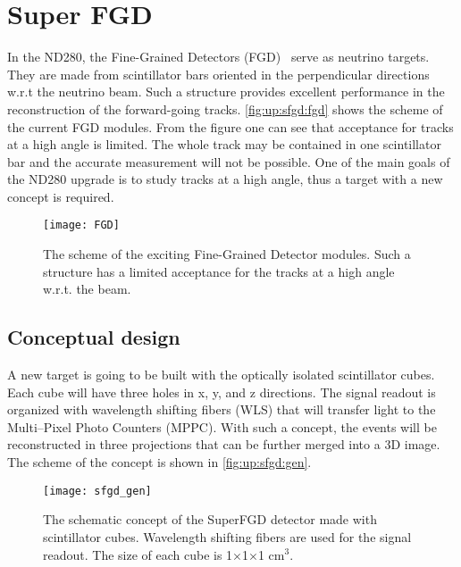 \documentclass[main.tex]{subfiles}
\begin{document}
\renewcommand{\labelitemi}{\ding{226}}
\renewcommand{\labelitemii}{\ding{227}}

\newcommand{\sfgdx}{192}
\newcommand{\sfgdy}{184}
\newcommand{\sfgdz}{56}

\chapter{Super FGD}
\label{ch:up:sfgd}
In the ND280, the Fine-Grained Detectors (FGD)~\cite{Amaudruz2012} serve as neutrino targets. They are made from scintillator bars oriented in the perpendicular directions w.r.t the neutrino beam. Such a structure provides excellent performance in the reconstruction of the forward-going tracks. \autoref{fig:up:sfgd:fgd} shows the scheme of the current FGD modules. From the figure one can see that acceptance for tracks at a high angle is limited. The whole track may be contained in one scintillator bar and the accurate measurement will not be possible. One of the main goals of the ND280 upgrade is to study tracks at a high angle, thus a target with a new concept is required.

\begin{figure}[!ht]
	\centering
	\texttt{[image: FGD]}
	\caption{The scheme of the exciting Fine-Grained Detector modules. Such a structure has a limited acceptance for the tracks at a high angle w.r.t. the beam.}
	\label{fig:up:sfgd:fgd}
\end{figure}

\section{Conceptual design}
A new target is going to be built with the optically isolated scintillator cubes. Each cube will have three holes in x, y, and z directions. The signal readout is organized with wavelength shifting fibers (WLS) that will transfer light to the Multi--Pixel Photo Counters (MPPC). With such a concept, the events will be reconstructed in three projections that can be further merged into a 3D image. The scheme of the concept is shown in \autoref{fig:up:sfgd:gen}.

\begin{figure}[!ht]
	\centering
	\texttt{[image: sfgd\_gen]}
	\caption{The schematic concept of the SuperFGD detector made with scintillator cubes. Wavelength shifting fibers are used for the signal readout. The size of each cube is 1$\times$1$\times$1 $\text{cm}^3$.}
	\label{fig:up:sfgd:gen}
\end{figure}
\end{document}
